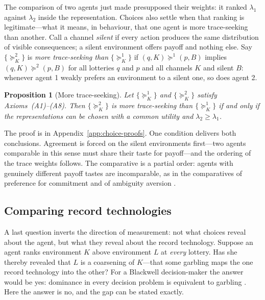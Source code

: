 \documentclass[11pt,a4paper]{article}
\newtheorem{proposition}[theorem]{Proposition}
\theoremstyle{definition}
\newcommand{\1}{\mathbf 1}
\begin{document}
The comparison of two agents just made presupposed their weights: it ranked $\lambda_1$ against $\lambda_2$
inside the representation.  Choices also settle when that ranking is legitimate---what it means, in behaviour,
that one agent is more trace-seeking than another.  Call a channel \emph{silent} if every action produces the
same distribution of visible consequences; a silent environment offers payoff and nothing else.  Say
$\{\succeq^2_K\}$ is \emph{more trace-seeking than} $\{\succeq^1_K\}$ if $(q,K)\succeq^1(p,B)$ implies
$(q,K)\succeq^2(p,B)$ for all lotteries $q$ and $p$ and all channels $K$ and silent $B$: whenever agent 1
weakly prefers an environment to a silent one, so does agent 2.

\begin{proposition}[More trace-seeking]\label{prop:comparative}
Let $\{\succeq^1_K\}$ and $\{\succeq^2_K\}$ satisfy Axioms~\textup{(A1)--(A8)}.  Then $\{\succeq^2_K\}$ is more
trace-seeking than $\{\succeq^1_K\}$ if and only if the representations can be chosen with a common utility and
$\lambda_2\ge\lambda_1$.
\end{proposition}

The proof is in Appendix~\ref{app:choice-proofs}.  One condition delivers both conclusions.  Agreement is
forced on the silent environments first---two agents comparable in this sense must share their taste for
payoff---and the ordering of the trace weights follows.  The comparative is a partial order: agents with
genuinely different payoff tastes are incomparable, as in the comparatives of preference for commitment and of
ambiguity aversion \cite{GulPesendorfer2001,GhirardatoMarinacci2002}.

\subsection{Comparing record technologies}\label{sec:cannot-reveal}

A last question inverts the direction of measurement: not what choices reveal about the agent, but what they
reveal about the record technology.  Suppose an agent ranks environment $K$ above environment $L$ at \emph{every} lottery.  Has she thereby revealed
that $L$ is a coarsening of $K$---that some garbling maps the one record technology into the other?  For a
Blackwell decision-maker the answer would be yes: dominance in every decision problem is equivalent to garbling
\cite{Blackwell1953}.  Here the answer is no, and the gap can be stated exactly.
\end{document}

